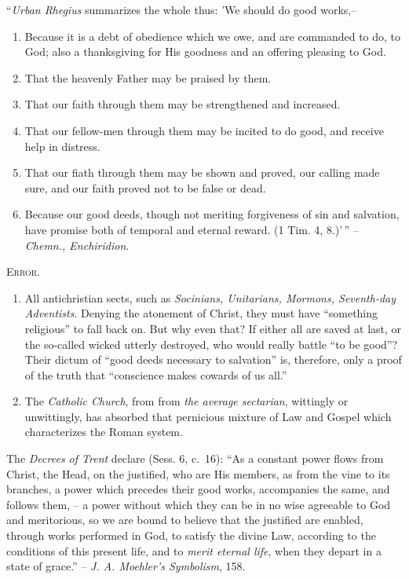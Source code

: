 \documentclass[
]{book}
\begin{document}
``\emph{Urban Rhegius} summarizes the whole thus: 'We should do good works,--

\begin{enumerate}
\def\labelenumi{\arabic{enumi}.}
\item
  Because it is a debt of obedience which we owe, and are commanded to do, to God; also a thanksgiving for His goodness and an offering pleasing to God.
\item
  That the heavenly Father may be praised by them.
\item
  That our faith through them may be strengthened and increased.
\item
  That our fellow-men through them may be incited to do good, and receive help in distress.
\item
  That our fiath through them may be shown and proved, our calling made sure, and our faith proved not to be false or dead.
\item
  Because our good deeds, though not meriting forgiveness of sin and salvation, have promise both of temporal and eternal reward. (1 Tim. 4, 8.)'\,'' -- \emph{Chemn., Enchiridion}.
\end{enumerate}

\begin{center}
\textsc{Error.}
\end{center}

\begin{enumerate}
\def\labelenumi{\arabic{enumi}.}
\item
  All antichristian sects, such as \emph{Socinians, Unitarians, Mormons, Seventh-day Adventists}. Denying the atonement of Christ, they must have ``something religious'' to fall back on. But why even that? If either all are saved at last, or the so-called wicked utterly destroyed, who would really battle ``to be good''? Their dictum of ``good deeds necessary to salvation'' is, therefore, only a proof of the truth that ``conscience makes cowards of us all.''
\item
  The \emph{Catholic Church}, from from \emph{the average sectarian}, wittingly or unwittingly, has absorbed that pernicious mixture of Law and Gospel which characterizes the Roman system.
\end{enumerate}

The \emph{Decrees of Trent} declare (Sess. 6, c.~16): ``As a constant power flows from Christ, the Head, on the justified, who are His members, as from the vine to its branches, a power which precedes their good works, accompanies the same, and follows them, -- a power without which they can be in no wise agreeable to God and meritorious, so we are bound to believe that the justified are enabled, through works performed in God, to satisfy the divine Law, according to the conditions of this present life, and to \emph{merit eternal life}, when they depart in a state of grace.'' -- \emph{J. A. Moehler's Symbolism}, 158.
\end{document}
